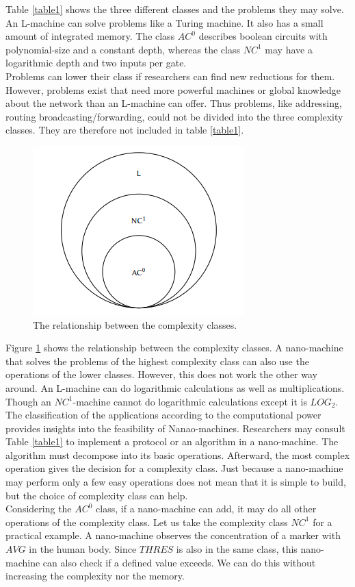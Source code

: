 \documentclass[10pt,sigconf]{acmart}
\begin{document}
Table \ref{table1} shows the three different classes and the problems they may solve.
An L-machine can solve problems like a Turing machine. It also has a small amount of integrated memory.
The class $AC^0$ describes boolean circuits with polynomial-size and a constant depth, whereas the class $NC^1$ may have a logarithmic depth and two inputs per gate.\\ 
Problems can lower their class if researchers can find new reductions for them. 
However, problems exist that need more powerful machines or global knowledge about the network than an L-machine can offer.
Thus problems, like addressing, routing broadcasting/forwarding, could not be divided into the three complexity classes.
They are therefore not included in table \ref{table1}.\\
\begin{figure}[h!]
  \centering
  \includegraphics[scale=1]{ComplexityClasses.PNG}
\caption[The relationship between the complexity classes]{The relationship between the complexity classes.\cite{lau2017computational}}
\label{complex}
\end{figure}
Figure \ref{complex} shows the relationship between the complexity classes.
A nano-machine that solves the problems of the highest complexity class can also use the operations of the lower classes.
However, this does not work the other way around.
An L-machine can do logarithmic calculations as well as multiplications.
Though an $NC^1$-machine cannot do logarithmic calculations except it is $LOG_2$. \\
The classification of the applications according to the computational power provides insights into the feasibility of Nanao-machines.
Researchers may consult Table \ref{table1} to implement a protocol or an algorithm in a nano-machine. 
The algorithm must decompose into its basic operations. Afterward, the most complex operation gives the decision for a complexity class.
Just because a nano-machine may perform only a few easy operations does not mean that it is simple to build, but the choice of complexity class can help.\\
Considering the $AC^0$ class, if a nano-machine can add, it may do all other operations of the complexity class.
Let us take the complexity class $NC^1$ for a practical example. A nano-machine observes the concentration of a marker with $AVG$ in the human body.
Since $THRES$ is also in the same class, this nano-machine can also check if a defined value exceeds. We can do this without increasing the complexity nor the memory.
\end{document}
